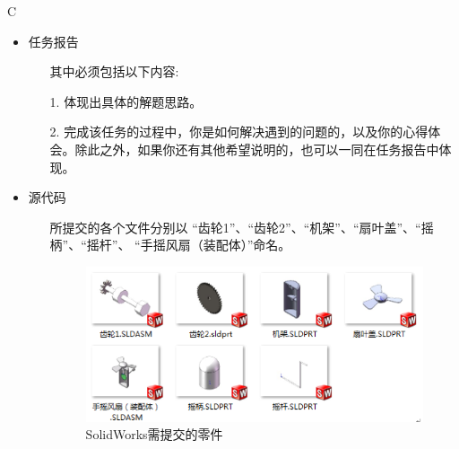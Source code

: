 \documentclass[12pt,a4paper]{article}
\begin{document}
\begin{ACEEsubmit}{C}
\begin{itemize}
	\item 任务报告
	\begin{itemize}
		\item[] 其中必须包括以下内容:
		\item[1.] 体现出具体的解题思路。
		\item[2.] 完成该任务的过程中，你是如何解决遇到的问题的，以及你的心得体会。除此之外，如果你还有其他希望说明的，也可以一同在任务报告中体现。
	\end{itemize}
	\item 源代码
	\begin{itemize}
		\item[] 所提交的各个文件分别以 ``齿轮1''、``齿轮2''、``机架''、``扇叶盖''、``摇柄''、``摇杆''、 ``手摇风扇（装配体）''命名。
		\begin{figure}[H]
			\small
			\centering
			\includegraphics[width=10cm]{fig5.png}
			\caption{SolidWorks需提交的零件} 
		\end{figure} 
	\end{itemize}
\end{itemize}

\end{ACEEsubmit}
\newpage
\end{document}
